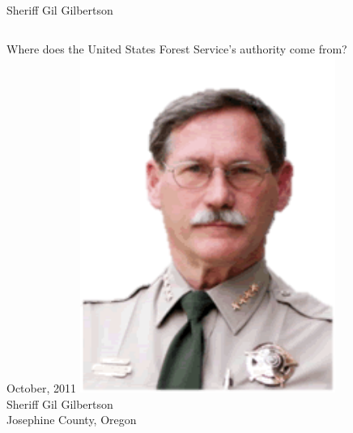 \begin{frame}{Sheriff Gil Gilbertson}
    \begin{columns}[onlytextwidth]
            \centering
            Where does the United States Forest Service's authority come from?
            \\ { \tiny October, 2011 }
            \centering
            \includegraphics[width=0.75\textwidth]{img/gil-gilbertson.png}
            \\ Sheriff Gil Gilbertson
            \\ Josephine County, Oregon
    \end{columns}
\end{frame}

